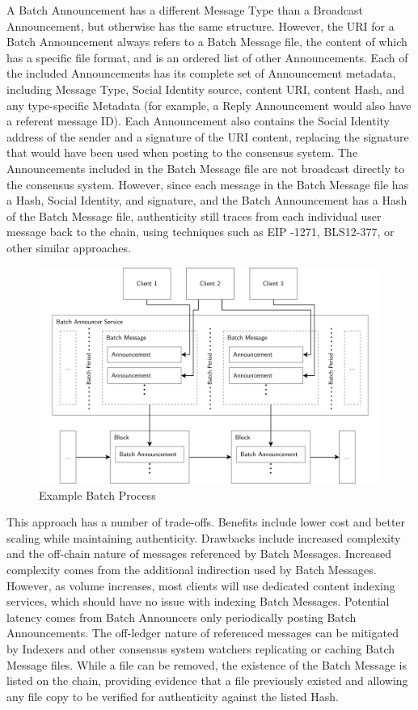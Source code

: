 \documentclass[12pt,letterpaper]{article}
\begin{document}
A Batch Announcement has a different Message Type than a Broadcast Announcement, but
otherwise has the same structure. However, the URI for a Batch Announcement always
refers to a Batch Message file, the content of which has a specific file format, and
is an ordered list of other Announcements. Each of the included Announcements has
its complete set of Announcement metadata, including Message Type, Social Identity
source, content URI, content Hash, and any type-specific Metadata (for example, a
Reply Announcement would also have a referent message ID).  Each Announcement also
contains the Social Identity address of the sender and a signature of the URI
content, replacing the signature that would have been used when posting to the
consensus system. The Announcements included in the Batch Message file are not
broadcast directly to the consensus system. However, since each message in the Batch
Message file has a Hash, Social Identity, and signature, and the Batch Announcement
has a Hash of the Batch Message file, authenticity still traces from each individual
user message back to the chain, using techniques such as EIP -1271,\cite{eip1271}
BLS12-377,\cite{el2020} or other similar approaches.

\begin{figure}
	\includegraphics[width=\linewidth]{figures/Example Batch Process.png}
	\caption{Example Batch Process}
	\label{fig:10}
\end{figure}

This approach has a number of trade-offs. Benefits include lower cost and better
scaling while maintaining authenticity. Drawbacks include increased complexity and
the off-chain nature of messages referenced by Batch Messages. Increased complexity
comes from the additional indirection used by Batch Messages. However, as volume
increases, most clients will use dedicated content indexing services, which should
have no issue with indexing Batch Messages. Potential latency comes from Batch
Announcers only periodically posting Batch Announcements. The off-ledger nature of
referenced messages can be mitigated by Indexers and other consensus system watchers
replicating or caching Batch Message files.  While a file can be removed, the
existence of the Batch Message is listed on the chain, providing evidence that a
file previously existed and allowing any file copy to be verified for authenticity
against the listed Hash.
\end{document}
